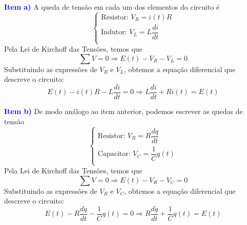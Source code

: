 \documentclass[oneside,12pt,a4paper]{report}
\begin{document}
        \begin{tcolorbox}[enhanced, breakable, colback=blue!1!white,colframe=blue!75!black,title=\textbf{\hyperlink{quest:ex13}{\hypertarget{resp:ex13}{Exercício 13}}}]
            \noindent\textcolor{blue}{\textbf{Item a)}} A queda de tensão em cada um dos elementos do circuito é
            \[\begin{cases}
                \text{Resistor: } V_R = i(t)R\\
                \text{Indutor: } V_L = L\dfrac{di}{dt}\\
            \end{cases}\]
            \noindent Pela Lei de Kirchoff das Tensões, temos que
            \[\sum V=0\Rightarrow E(t)-V_R-V_L=0\]
            \noindent Substituindo as expressões de $V_R$ e $V_L$, obtemos a equação diferencial que descreve o circuito:
            \[E(t) - i(t)R - L\frac{di}{dt} = 0 \Rightarrow \boxed{L\frac{di}{dt} + Ri(t) = E(t)}\]

            \noindent\textcolor{blue}{\textbf{Item b)}} De modo análogo ao item anterior, podemos escrever as quedas de tensão 
            \[\begin{cases}
                \text{Resistor: } V_R = R\dfrac{dq}{dt}\\
                \text{Capacitor: } V_C = \dfrac{1}{C}q(t)\\
            \end{cases}\]
            \noindent Pela Lei de Kirchoff das Tensões, temos que
            \[\sum V=0\Rightarrow E(t)-V_R-V_C=0\]
            \noindent Substituindo as expressões de $V_R$ e $V_C$, obtemos a equação diferencial que descreve o circuito:
            \[E(t) - R\frac{dq}{dt} - \frac{1}{C}q(t) = 0 \Rightarrow \boxed{R\frac{dq}{dt} + \frac{1}{C}q(t) = E(t)}\]

        \end{tcolorbox}
\end{document}
